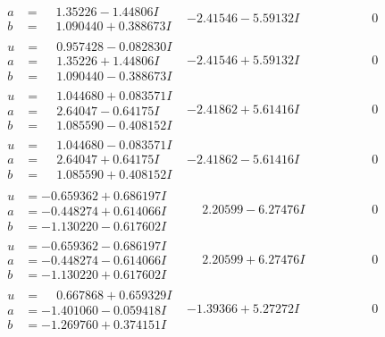 \documentclass[1p]{elsarticle_modified}
\theoremstyle{definition}
\begin{document}
$$\begin{array}{c|c|c}
\begin{aligned}
a &= \phantom{-}1.35226 - 1.44806 I \\
b &= \phantom{-}1.090440 + 0.388673 I\end{aligned}
 & -2.41546 - 5.59132 I & \phantom{-0.000000 } 0 \\ \hline\begin{aligned}
u &= \phantom{-}0.957428 - 0.082830 I \\
a &= \phantom{-}1.35226 + 1.44806 I \\
b &= \phantom{-}1.090440 - 0.388673 I\end{aligned}
 & -2.41546 + 5.59132 I & \phantom{-0.000000 } 0 \\ \hline\begin{aligned}
u &= \phantom{-}1.044680 + 0.083571 I \\
a &= \phantom{-}2.64047 - 0.64175 I \\
b &= \phantom{-}1.085590 - 0.408152 I\end{aligned}
 & -2.41862 + 5.61416 I & \phantom{-0.000000 } 0 \\ \hline\begin{aligned}
u &= \phantom{-}1.044680 - 0.083571 I \\
a &= \phantom{-}2.64047 + 0.64175 I \\
b &= \phantom{-}1.085590 + 0.408152 I\end{aligned}
 & -2.41862 - 5.61416 I & \phantom{-0.000000 } 0 \\ \hline\begin{aligned}
u &= -0.659362 + 0.686197 I \\
a &= -0.448274 + 0.614066 I \\
b &= -1.130220 - 0.617602 I\end{aligned}
 & \phantom{-}2.20599 - 6.27476 I & \phantom{-0.000000 } 0 \\ \hline\begin{aligned}
u &= -0.659362 - 0.686197 I \\
a &= -0.448274 - 0.614066 I \\
b &= -1.130220 + 0.617602 I\end{aligned}
 & \phantom{-}2.20599 + 6.27476 I & \phantom{-0.000000 } 0 \\ \hline\begin{aligned}
u &= \phantom{-}0.667868 + 0.659329 I \\
a &= -1.401060 - 0.059418 I \\
b &= -1.269760 + 0.374151 I\end{aligned}
 & -1.39366 + 5.27272 I & \phantom{-0.000000 } 0 \\ \hline\begin{aligned}

\end{aligned}
\end{array}$$
\end{document}
